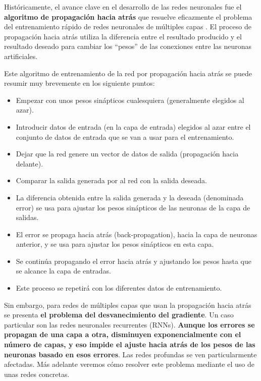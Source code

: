 \documentclass[]{book}
\providecommand{\tightlist}{%
  \setlength{\itemsep}{0pt}\setlength{\parskip}{0pt}}
\begin{document}
Históricamente, el avance clave en el desarrollo de las redes neuronales
fue el \textbf{algoritmo de propagación hacia atrás} que resuelve
eficazmente el problema del entrenamiento rápido de redes neuronales de
múltiples capas \citep{werbos1975beyond}. El proceso de propagación
hacia atrás utiliza la diferencia entre el resultado producido y el
resultado deseado para cambiar los ``pesos'' de las conexiones entre las
neuronas artificiales.

Este algoritmo de entrenamiento de la red por propagación hacia atrás se
puede resumir muy brevemente en los siguiente puntos:

\begin{itemize}
\tightlist
\item
  Empezar con unos pesos sinápticos cualesquiera (generalmente elegidos
  al azar).
\item
  Introducir datos de entrada (en la capa de entrada) elegidos al azar
  entre el conjunto de datos de entrada que se van a usar para el
  entrenamiento.
\item
  Dejar que la red genere un vector de datos de salida (propagación
  hacia delante).
\item
  Comparar la salida generada por al red con la salida deseada.
\item
  La diferencia obtenida entre la salida generada y la deseada
  (denominada error) se usa para ajustar los pesos sinápticos de las
  neuronas de la capa de salidas.
\item
  El error se propaga hacia atrás (back-propagation), hacia la capa de
  neuronas anterior, y se usa para ajustar los pesos sinápticos en esta
  capa.
\item
  Se continúa propagando el error hacia atrás y ajustando los pesos
  hasta que se alcance la capa de entradas.
\item
  Este proceso se repetirá con los diferentes datos de entrenamiento.
\end{itemize}

Sin embargo, para redes de múltiples capas que usan la propagación hacia
atrás se presenta \textbf{el problema del desvanecimiento del
gradiente}. Un caso particular son las redes neuronales recurrentes
(RNNs). \textbf{Aunque los errores se propagan de una capa a otra,
disminuyen exponencialmente con el número de capas, y eso impide el
ajuste hacia atrás de los pesos de las neuronas basado en esos errores}.
Las redes profundas se ven particularmente afectadas. Más adelante
veremos cómo resolver este problema mediante el uso de unas redes
concretas.
\end{document}
